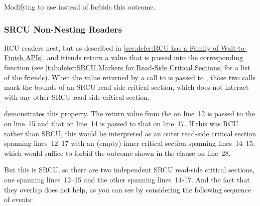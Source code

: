 Modifying  to use  instead of  forbids this outcome.

\subsubsection{SRCU Non-Nesting Readers}
\label{sec:memorder:SRCU Non-Nesting Readers}

RCU readers nest, but as described in
\cref{sec:defer:RCU has a Family of Wait-to-Finish APIs},
 and friends return a value that is passed into
the corresponding  function (see
\cref{tab:defer:SRCU Markers for Read-Side Critical Sections}
for a list of the friends).
When the value returned by a call to  is passed
to , those two calls mark the bounds of an SRCU
read-side critical section, which does not interact with any other SRCU
read-side critical section.

\begin{listing}

\caption{SRCU Readers Don't Nest}
\label{lst:memorder:SRCU Readers Don't Nest}
\end{listing}

demonstrates this property.
The return value from the  on line~12 is passed to
the  on line~15 and that on line~14 is passed to
that on line~17.
If this was RCU rather than SRCU, this would be interpreted as an outer
read-side critical section spanning lines~12--17 with an (empty) inner
critical section spanning lines~14--15, which would suffice to forbid
the outcome shown in the  clause on line~28.

But this is SRCU, so there are two independent SRCU read-side critical
sections, one spanning lines~12--15 and the other spanning lines~14-17.
And the fact that they overlap does not help, as you can see by considering
the following sequence of events:

